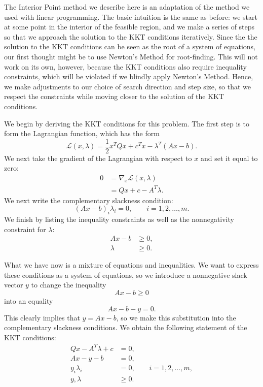 The Interior Point method we describe here is an adaptation of the method we used with linear
programming. The basic intuition is the same as before: we start at some point in the interior of the
feasible region, and we make a series of steps so that we approach the solution to the KKT conditions
iteratively. Since the the solution to the KKT conditions can be seen as the root of a system of equations,
our first thought might be to use Newton's Method for root-finding. This will not work on its own, however,
because the KKT conditions also require inequality constraints, which will be violated if we blindly apply
Newton's Method. Hence, we make adjustments to our choice of search direction and step size, so that we
respect the constraints while moving closer to the solution of the KKT conditions.

We begin by deriving the KKT conditions for this problem. The first step is to form the Lagrangian function,
which has the form
\[
\mathcal{L}(x,\lambda) = \frac{1}{2}x^TQx + c^Tx - \lambda^T(Ax -b).
\]
We next take the gradient of the Lagrangian with respect to $x$ and set it equal to zero:
\begin{align*}
0 &= \nabla_x \mathcal{L}(x,\lambda)\\
&= Qx + c - A^T\lambda.
\end{align*}
We next write the complementary slackness condition:
\[
(Ax - b)_i\lambda_i = 0, \qquad i=1,2,\ldots,m.
\]
We finish by listing the inequality constraints as well as the nonnegativity constraint for $\lambda$:
\begin{align*}
Ax - b &\geq 0,\\
\lambda &\geq 0.
\end{align*}

What we have now is a mixture of equations and inequalities. We want to express these conditions as a system of equations,
so we introduce a nonnegative slack vector $y$ to change the inequality
\[
Ax - b \geq 0
\]
into an equality
\[
Ax - b - y = 0.
\]
This clearly implies that $y = Ax - b$, so we make this substitution into the complementary slackness conditions.
We obtain the following statement of the KKT conditions:
\begin{align*}
Qx - A^T\lambda + c &= 0,\\
Ax - y - b &= 0,\\
y_i\lambda_i &= 0, \qquad i=1,2,\ldots,m,\\
y,\lambda &\geq 0.
\end{align*}

